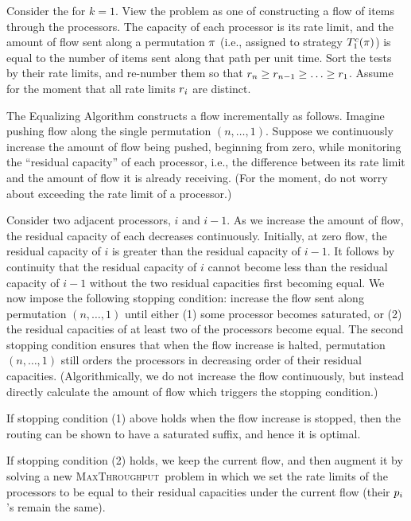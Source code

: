 \documentclass{article}
\newcounter{ass}
\newcommand{\ens}[1]{\ensuremath{#1}}					\newcommand{\card}[1]{\ens{|#1|}}							\newcommand{\dotlist}[2]{\ens{#1,\ldots,#2}}
\newcommand{\valn}{\ens{n}}
\newcommand{\valk}{\ens{k}}
\newcommand{\maxthru}{\textsc{MaxThroughput}}
\newcommand{\processor}{processor}
\begin{document}
Consider the \cmt{} for $\valk=1$.  View the problem
as one of constructing a flow of items through the
{\processor}s.  The capacity of each {\processor} is
its rate limit,
and the amount of flow sent along a permutation  $\perm$ (i.e., assigned to
strategy $\cstrat{1}{\perm}$)
is equal to the number of items sent along that path per unit time.
Sort the tests by their rate limits, and re-number them so that
$\rate{\valn} \geq \rate{n-1} \geq \ldots \geq \rate 1$.
Assume for the moment that all rate limits $\rate i$ are distinct.

The Equalizing Algorithm constructs a flow
incrementally as follows.   Imagine pushing 
flow along the single permutation 
$(\valn, \ldots, 1)$.
Suppose we continuously increase the amount of flow being pushed,
beginning from zero,
while monitoring the
``residual capacity'' of each
{\processor}, i.e., the difference between its rate
limit and the amount of flow it is already receiving.
(For the moment, do not worry about
exceeding the rate limit of a {\processor}.) 

Consider two adjacent {\processor}s, $i$ and $i-1$.
As we increase the amount of flow, the residual capacity of
each decreases continuously.  
Initially, at zero flow,
the residual capacity of $i$ is greater
than the residual capacity of $i-1$.  
It follows by continuity that the
residual capacity of $i$ cannot become less than
the residual capacity of $i-1$ without the two residual
capacities first becoming equal.
We now impose the following stopping condition: 
increase the flow sent along permutation $(\valn, \ldots, 1)$
until either
(1) some {\processor} becomes saturated,
or (2) the residual capacities of at least two of the {\processor}s
become equal.  
The second stopping condition ensures that when the flow increase is halted,
permutation $(\valn, \ldots, 1)$ still orders the {\processor}s in
decreasing order of their residual capacities.
(Algorithmically, we do not increase the
flow continuously, but instead directly calculate the amount of flow
which triggers the stopping condition.)

If stopping condition (1) above holds
when the flow increase is stopped, 
then the routing can be shown to have a saturated suffix, and hence
it is optimal.

If stopping condition (2) holds, we keep the current flow, and then
augment it by solving a new \maxthru\ problem in which
we set the rate limits of the {\processor}s to be equal to their residual
capacities under the current flow (their $\pr i$'s remain the same).
\end{document}
